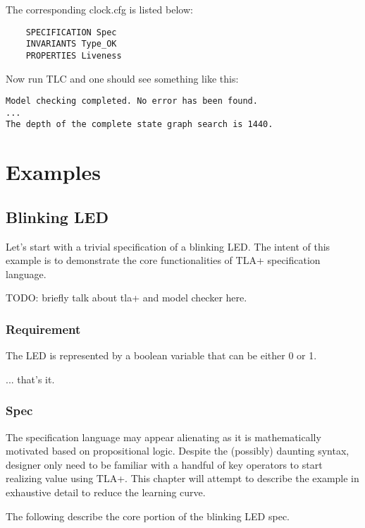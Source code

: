 \documentclass{report}
\begin{document}
The corresponding clock.cfg is listed below: 
\begin{lstlisting}
    SPECIFICATION Spec
    INVARIANTS Type_OK
    PROPERTIES Liveness
\end{lstlisting}

Now run TLC and one should see something like this: 
\begin{lstlisting}
Model checking completed. No error has been found.
...
The depth of the complete state graph search is 1440.
\end{lstlisting}

\part{Examples}

\chapter{Blinking LED}

Let's start with a trivial specification of a blinking LED. The intent of this example 
is to demonstrate the core functionalities of TLA+ specification language.

TODO: briefly talk about tla+ and model checker here.

\section{Requirement}

The LED is represented by a boolean variable that can be either 0 or 1.\newline

... that's it.

\section{Spec}

The specification language may appear alienating as it is mathematically
motivated based on propositional logic. Despite the (possibly) daunting syntax,
designer only need to be familiar with a handful of key operators to start
realizing value using TLA+. This chapter will attempt to describe the example in
exhaustive detail to reduce the learning curve.

The following describe the core portion of the blinking LED spec. 
\end{document}
